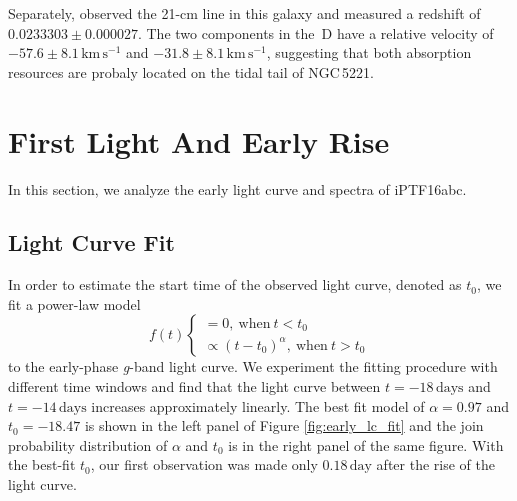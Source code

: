 \documentclass[twocolumn]{aastex61}
\begin{document}
Separately, \cite{1998A&AS..130..333T} observed
the 21-cm line in this galaxy and measured a redshift of $0.0233303\pm0.000027$.
The two components in the \,D have a relative velocity of
$-57.6\pm8.1\,\textrm{km}\,\textrm{s}^{-1}$ and
$-31.8\pm8.1\,\textrm{km}\,\textrm{s}^{-1}$, suggesting that both absorption
resources are probaly located on the tidal tail of NGC\,5221. 


\section{First Light And Early Rise}
\label{sec:early_phases}

In this section, we analyze the early light curve and spectra of iPTF16abc.

\subsection{Light Curve Fit}
\label{sec:lc_fit}

In order to estimate the start time of the observed light curve, denoted as $t_0$,
we fit a power-law model
\begin{equation}
  \label{eq:broken_power_law}
  f(t) \left\{
    \begin{array}{ll}
      = 0,\ \textrm{when}\ t<t_0 \\
      \propto (t-t_0)^{\alpha},\ \textrm{when}\ t>t_0
    \end{array}
  \right.
\end{equation}
to the early-phase \textit{g}-band light curve. We experiment the
fitting procedure with different time windows and find that the light
curve between $t=-18\,\textrm{days}$ and $t=-14\,\textrm{days}$
increases approximately linearly. The best fit model of
$\alpha = 0.97$ and $t_0=-18.47$ is shown in the left panel of
Figure \ref{fig:early_lc_fit} and the join probability distribution of
$\alpha$ and $t_0$ is in the right panel of the same figure.  With the
best-fit $t_0$, our first observation was made only
$0.18\,\textrm{day}$ after the rise of the light curve.
\end{document}
